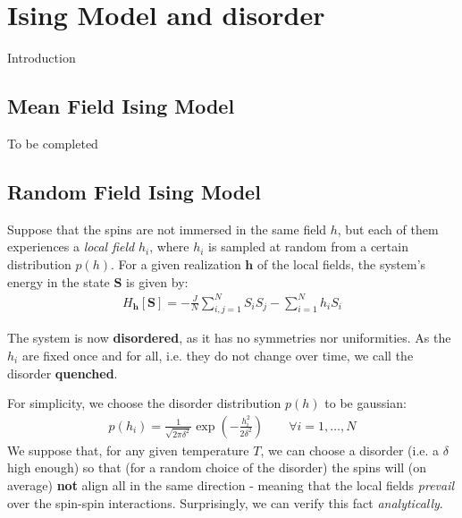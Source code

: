 \documentclass[../template.tex]{subfiles}
\begin{document}
\chapter{Ising Model and disorder}

Introduction

\section{Mean Field Ising Model}
To be completed

\section{Random Field Ising Model}
Suppose that the spins are not immersed in the same field $h$, but each of them experiences a \textit{local field} $h_i$, where $h_i$ is sampled at random from a certain distribution $p(h)$. For a given realization $\bm{h}$ of the local fields, the system's energy in the state $\bm{S}$ is given by:
\begin{align}\label{eqn:disordered-energy}
    H_{\bm{h}}[\bm{S}] = -\frac{J}{N} \sum_{i,j=1}^N S_i S_j - \sum_{i=1}^N h_i S_i
\end{align}

The system is now \textbf{disordered}, as it has no symmetries nor uniformities. As the $h_i$ are fixed once and for all, i.e. they do not change over time, we call the disorder \textbf{quenched}.  

\medskip

For simplicity, we choose the disorder distribution $p(h)$ to be gaussian:
\begin{align*}
    p(h_i) = \frac{1}{\sqrt{2 \pi \delta^2}} \exp\left(-\frac{h_i^2}{2 \delta^2} \right) \qquad \forall i=1,\dots,N
\end{align*}
We suppose that, for any given temperature $T$, we can choose a disorder  (i.e. a $\delta$ high enough) so that (for a random choice of the disorder) the spins will (on average) \textbf{not} align all in the same direction - meaning that the local fields \textit{prevail} over the spin-spin interactions. Surprisingly, we can verify this fact \textit{analytically}.   

\medskip
\end{document}
